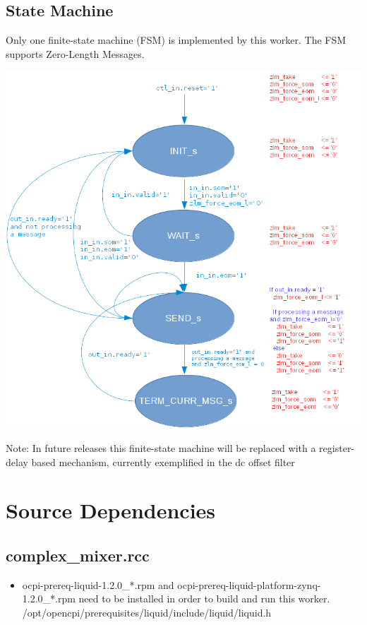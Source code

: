 \documentclass{article}
\def\comp{complex\_mixer}
\begin{document}
\newpage
\subsection*{State Machine}
	\begin{flushleft}
		Only one finite-state machine (FSM) is implemented by this worker. The FSM supports Zero-Length Messages.
	\end{flushleft}
	{\centering\captionsetup{type=figure}\includegraphics[scale=0.45]{complex_mixer_zlm_fsm}
	\label{fig:zlm_fsm}}
        \begin{flushleft}
                Note: In future releases this finite-state machine will be replaced with a register-delay based mechanism, currently exemplified in the dc offset filter
        \end{flushleft}

\newpage
\section*{Source Dependencies}
\subsection*{\comp.rcc}
\begin{itemize}
   \item ocpi-prereq-liquid-1.2.0\_*.rpm and 	ocpi-prereq-liquid-platform-zynq-1.2.0\_*.rpm need to be installed in order to build and run this worker.
   \subitem /opt/opencpi/prerequisites/liquid/include/liquid/liquid.h
\end{itemize}
\end{document}
